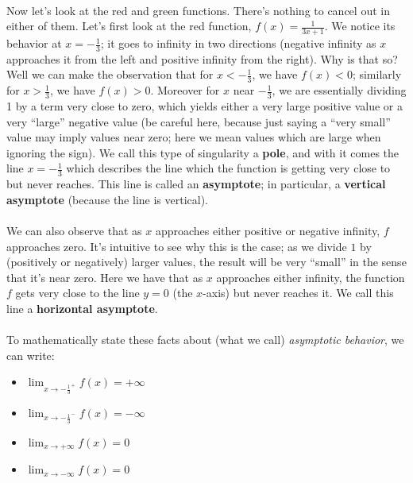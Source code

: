 \documentclass[12pt, a4paper, titlepage, twoside]{article}
\begin{document}
	\paragraph{}
	Now let's look at the red and green functions. There's nothing to cancel out in either of them. Let's first look at the red function,
	$f(x) = \frac{1}{3x+1}$. We notice its behavior at $x = -\frac{1}{3}$; it goes to infinity in two directions (negative infinity as $x$ 
	approaches it from the left and positive infinity from the right). Why is that so? Well we can make the observation that for $x < -\frac{1}{3}$,
	we have $f(x) < 0$; similarly for $x > \frac{1}{3}$, we have $f(x) > 0$. Moreover for $x$ near $-\frac{1}{3}$, we are essentially dividing
	1 by a term very close to zero, which yields either a very large positive value or a very ``large'' negative value (be careful here, because
	just saying a ``very small'' value may imply values near zero; here we mean values which are large when ignoring the sign). We call this 
	type of singularity a \textbf{pole}, and with it comes the line $x = -\frac{1}{3}$ which describes the line which the function is getting very 
	close to but never reaches. This line is called an \textbf{asymptote}; in particular, a \textbf{vertical asymptote} (because the line is vertical).
	
	\paragraph{}
	We can also observe that as $x$ approaches either positive or negative infinity, $f$ approaches zero. It's intuitive to see why this is the
	case; as we divide $1$ by (positively or negatively) larger values, the result will be very ``small'' in the sense that it's near zero.
	Here we have that as $x$ approaches either infinity, the function $f$ gets very close to the line $y=0$ (the $x$-axis) but never reaches it.
	We call this line a \textbf{horizontal asymptote}.
	
	\paragraph{}
	To mathematically state these facts about (what we call) \textit{asymptotic behavior}, we can write:
	\begin{multicols}{2}
	\begin{itemize}
		\item $\displaystyle \lim_{x \to -\frac{1}{3}^+} f(x) = +\infty$
		\item $\displaystyle \lim_{x \to -\frac{1}{3}^-} f(x) = -\infty$
		\item $\displaystyle \lim_{x \to +\infty} f(x) = 0$
		\item $\displaystyle \lim_{x \to -\infty} f(x) = 0$
	\end{itemize}
	\end{multicols}
	
\end{document}
